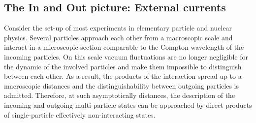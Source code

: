 \documentclass[12pt, titlepage]{article}
\begin{document}
\subsection{The In and Out picture: External currents}
Consider the set-up of most experiments in elementary particle and nuclear physics. Several particles approach each other from a macroscopic scale and interact in a microscopic section comparable to the Compton wavelength of the incoming particles. On this scale vacuum fluctuations are no longer negligible for the dynamic of the involved particles and make them impossible to distinguish between each other. As a result, the products of the interaction spread up to a macroscopic distances and the distinguishability between outgoing particles is admitted. Therefore, at such asymptotically distances, the description of the incoming and outgoing multi-particle states can be approached by direct products of single-particle effectively non-interacting states.
\end{document}
